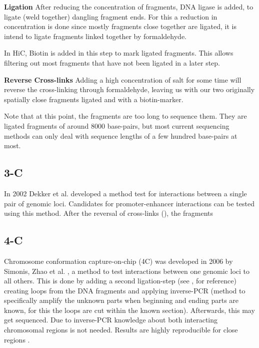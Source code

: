 \textbf{Ligation}\label{sec:ligation}
After reducing the concentration of fragments, DNA ligase is added, to ligate
(weld together) dangling fragment ends. For this a reduction in concentration
is done since mostly fragments close together are ligated, it is intend to
ligate fragments linked together by formaldehyde.

In HiC, Biotin is added in this step to mark ligated fragments. This allows
filtering out most fragments that have not been ligated in a later step.


\textbf{Reverse Cross-links}\label{sec:revcrosslink}
Adding a high concentration of salt for some time will reverse the
cross-linking through formaldehyde, leaving us with our two originally
spatially close fragments ligated and with a biotin-marker.

Note that at this point, the fragments are too long to sequence them.
They are ligated fragments of around 8000 base-pairs, but most current
sequencing methods can only deal with sequence lengths of a few hundred
base-pairs at most.




\subsection{3-C}\label{sec:3C}

In 2002 Dekker et al. \cite{dekker2002capturing} developed a method test for interactions
between a single pair of genomic loci. Candidates for promoter-enhancer
interactions can be tested using this method.
After the reversal of cross-links (), the fragments



\subsection{4-C}\label{sec:4C}

Chromosome conformation capture-on-chip (4C) was developed in 2006 by Simonis,
Zhao et al. \cite{simonis2006nuclear} \cite{zhao2006circular}, a method to test
interactions between one genomic loci to all others. This is done by adding a
second ligation-step (see ,  for
reference) creating loops from the DNA fragments and applying inverse-PCR
(method to specifically amplify the unknown parts when beginning and ending
parts are known, for this the loops are cut within the known section).
Afterwards, this may get sequenced. Due to inverse-PCR knowledge about both
interacting chromosomal regions is not needed. Results are highly reproducible
for close regions .

